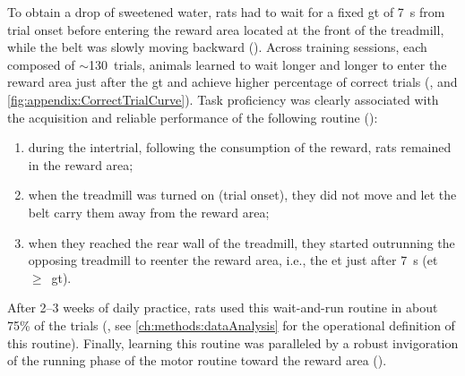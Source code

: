 To obtain a drop of sweetened water, rats had to wait for a fixed \gls{gt} of 7~s from trial onset before entering the reward area located at the front of the treadmill, while the belt was slowly moving backward ().
Across training sessions, each composed of $\sim$130~trials, animals learned to wait longer and longer to enter the reward area just after the \gls{gt} and achieve higher percentage of correct trials (, and \autoref{fig:appendix:CorrectTrialCurve}).
Task proficiency was clearly associated with the acquisition and reliable performance of the following routine ():
\begin{enumerate}[noitemsep, label=\Roman*.]
    \item during the intertrial, following the consumption of the reward, rats remained in the reward area;
    \item when the treadmill was turned on (trial onset), they did not move and let the belt carry them away from the reward area;
    \item when they reached the rear wall of the treadmill, they started outrunning the opposing treadmill to reenter the reward area, i.e., the \gls{et} just after 7~s (\gls{et}~$\geq$~\gls{gt}).
\end{enumerate}
After 2--3 weeks of daily practice, rats used this wait-and-run routine in about 75\% of the trials (, see \autoref{ch:methods:dataAnalysis} for the operational definition of this routine).
Finally, learning this routine was paralleled by a robust invigoration of the running phase of the motor routine toward the reward area ().

